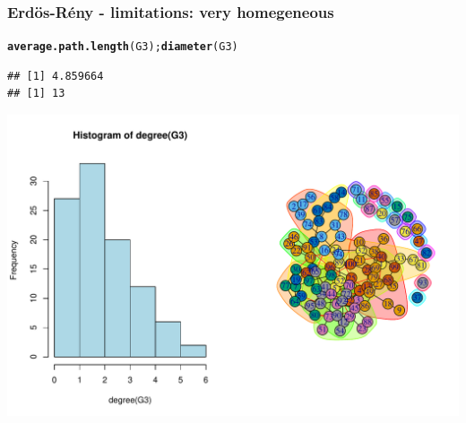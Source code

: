 \documentclass{beamer}\usepackage[]{graphicx}\usepackage[]{color}
\makeatletter
\newcommand{\hlstd}[1]{\textcolor[rgb]{0.345,0.345,0.345}{#1}}%
\newcommand{\hlkwd}[1]{\textcolor[rgb]{0.737,0.353,0.396}{\textbf{#1}}}%
\newenvironment{kframe}{%
 \def\at@end@of@kframe{}%
 \ifinner\ifhmode%
  \def\at@end@of@kframe{\end{minipage}}%
  \begin{minipage}{\columnwidth}%
 \fi\fi%
 \def\FrameCommand##1{\hskip\@totalleftmargin \hskip-\fboxsep
 \colorbox{shadecolor}{##1}\hskip-\fboxsep
     \hskip-\linewidth \hskip-\@totalleftmargin \hskip\columnwidth}%
 \MakeFramed {\advance\hsize-\width
   \@totalleftmargin\z@ \linewidth\hsize
   \@setminipage}}%
 {\par\unskip\endMakeFramed%
 \at@end@of@kframe}
\newenvironment{knitrout}{}{} %
\makeatother
\begin{document}
\begin{frame}[fragile]
  \frametitle{Erdös-Rény - limitations: very homegeneous}

\begin{knitrout}\scriptsize
{}\color{fgcolor}\begin{kframe}
\begin{alltt}
\hlkwd{average.path.length}\hlstd{(G3);} \hlkwd{diameter}\hlstd{(G3)}
\end{alltt}
\begin{verbatim}
## [1] 4.859664
## [1] 13
\end{verbatim}
\end{kframe}
\end{knitrout}

\begin{knitrout}\scriptsize
{}\color{fgcolor}
\includegraphics[width=.8\textwidth]{figures/ER_limitation2-1} 

\end{knitrout}
\end{frame}
\end{document}
